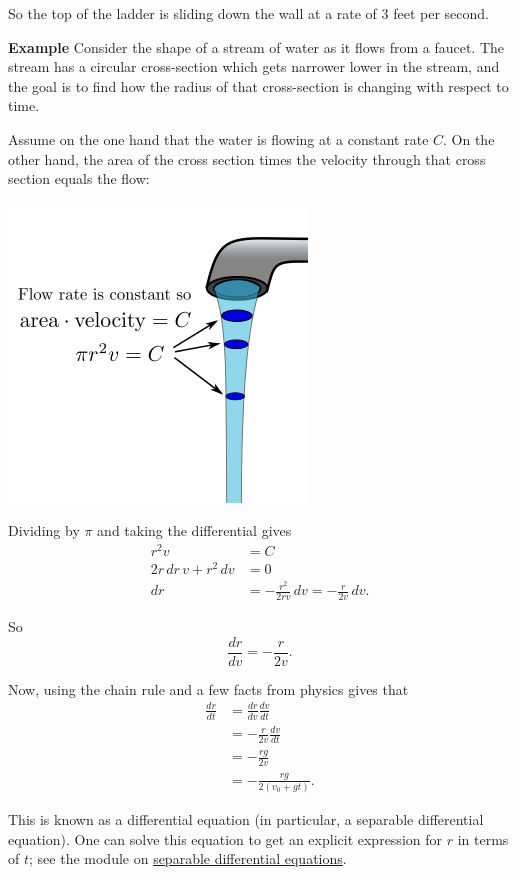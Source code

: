 \documentclass[twoside,openright,titlepage,a4paper]{book}
\begin{document}
\begin{sloppypar}
\begin{examplebox}
So the top of the ladder is sliding down the wall at a rate of 3 feet per second.
\end{examplebox}
\bigbreak
\textbf{Example} Consider the shape of a stream of water as it flows from a faucet. The stream has a circular cross-section which gets narrower lower in the stream, and the goal is to find how the radius of that cross-section is changing with respect to time.

Assume on the one hand that the water is flowing at a constant rate $C$. On the other hand, the area of the cross section times the velocity through that cross section equals the flow:
\begin{center}\includegraphics[scale=0.6]{Faucet}\end{center}

Dividing by $\pi$ and taking the differential gives
\begin{align*}
r^2 v &= C \\
2r \, dr \, v + r^2 \, dv &= 0 \\
dr &= -\frac{r^2}{2rv} \, dv = -\frac{r}{2v} \, dv.
\end{align*}

So \[ \frac{dr}{dv} = -\frac{r}{2v}. \]

Now, using the chain rule and a few facts from physics gives that
\begin{align*}
\frac{dr}{dt} &= \frac{dr}{dv} \frac{dv}{dt} \\
&= -\frac{r}{2v} \frac{dv}{dt} \\
&= -\frac{rg}{2v} \\
&= -\frac{rg}{2(v_0 + gt)}.
\end{align*}

This is known as a differential equation (in particular, a separable differential equation). One can solve this equation to get an explicit expression for $r$ in terms of $t$; see the module on \hyperref[ChIntegrationSecMoreDifferentialEquationsSubsecSeparableDifferentialEquations]{separable differential equations}.


\end{sloppypar}
\end{document}
